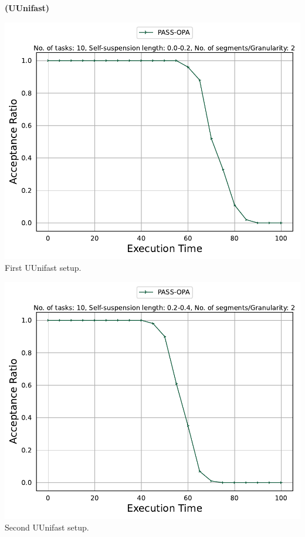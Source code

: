 \documentclass[]{article}
\begin{document}
	\begin{minipage}[t]{0.48\linewidth}
		\centering
		\textbf{(UUnifast)}
		\vspace{0.3cm}
		
		\includegraphics[width=\linewidth]{PASS-OPA[2][0.0-0.2][10].pdf}
		First UUnifast setup.
		\vspace{0.3cm}
		
		\includegraphics[width=\linewidth]{PASS-OPA[2][0.2-0.4][10].pdf}
		Second UUnifast setup.
		\vspace{0.3cm}
		

\end{minipage}
\end{document}
